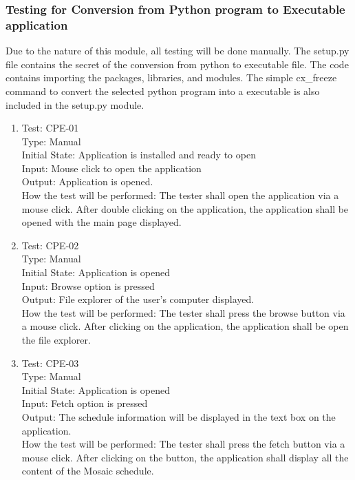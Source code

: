 \documentclass[12pt, titlepage]{article}
\begin{document}
\subsubsection{Testing for Conversion from Python program to Executable application}
\hspace{5mm}Due to the nature of this module, all testing will be done manually. The setup.py file contains the secret of the conversion from python to executable file.
The code contains importing the packages, libraries, and modules. The simple cx\_freeze command to convert the selected python program into a executable is also included in the setup.py module.
\begin{enumerate}
    \item Test: CPE-01\\
    
    Type: Manual\\
    Initial State: Application is installed and ready to open\\
    Input: Mouse click to open the application\\
    Output: Application is opened.\\
    How the test will be performed: The tester shall open the application via a mouse click. After double clicking on the application, the application shall be opened with the main page displayed.\\
    
    \item Test: CPE-02\\
    
    Type: Manual\\
    Initial State: Application is opened\\
    Input: Browse option is pressed\\
    Output: File explorer of the user's computer displayed.\\
    How the test will be performed: The tester shall press the browse button via a mouse click. After clicking on the application, the application shall be open the file explorer.\\
    
    \item Test: CPE-03\\
    
    Type: Manual\\
    Initial State: Application is opened\\
    Input: Fetch option is pressed\\
    Output: The schedule information will be displayed in the text box on the application.\\
    How the test will be performed: The tester shall press the fetch button via a mouse click. After clicking on the button, the application shall display all the content of the Mosaic schedule.\\
    

\end{enumerate}
\end{document}
